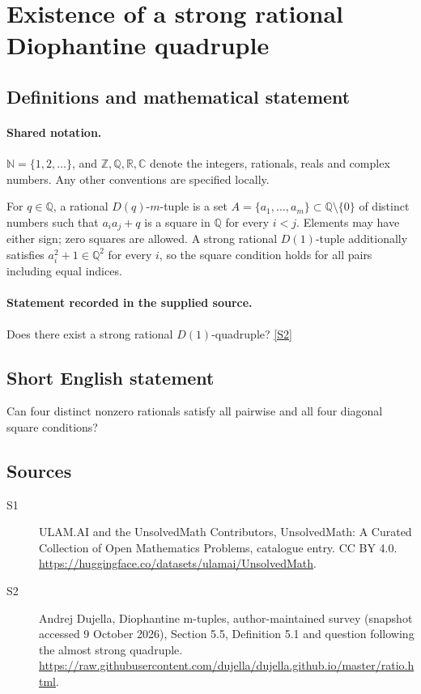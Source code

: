 \documentclass[11pt]{article}
\newcommand{\sref}[2]{\hyperlink{source:#1:#2}{[S#2]}}
\begin{document}
\section{Existence of a strong rational Diophantine quadruple}\label{statement}

\subsection{Definitions and mathematical statement}

\paragraph{Shared notation.}$\mathbb N=\{1,2,\ldots\}$, and $\mathbb Z,\mathbb Q,\mathbb R,\mathbb C$ denote the integers, rationals, reals and complex numbers. Any other conventions are specified locally.


For $q\in\mathbb Q$, a rational $D(q)$-$m$-tuple is a set $A=\{a_1,\ldots,a_m\}\subset\mathbb Q\setminus\{0\}$ of distinct numbers such that $a_i a_j+q$ is a square in $\mathbb Q$ for every $i<j$. Elements may have either sign; zero squares are allowed. A strong rational $D(1)$-tuple additionally satisfies $a_i^2+1\in\mathbb Q^2$ for every $i$, so the square condition holds for all pairs including equal indices.
\paragraph{Statement recorded in the supplied source.}
Does there exist a strong rational $D(1)$-quadruple? \sref{statement}{2}
\subsection{Short English statement}
Can four distinct nonzero rationals satisfy all pairwise and all four diagonal square conditions?
\subsection{Sources}
\begin{description}
\item[\hypertarget{source:statement:1}{S1}] ULAM.AI and the UnsolvedMath Contributors, UnsolvedMath: A Curated Collection of Open Mathematics Problems, catalogue entry. CC BY 4.0. \url{https://huggingface.co/datasets/ulamai/UnsolvedMath}.
\item[\hypertarget{source:statement:2}{S2}] Andrej Dujella, Diophantine m-tuples, author-maintained survey (snapshot accessed 9 October 2026), Section 5.5, Definition 5.1 and question following the almost strong quadruple. \url{https://raw.githubusercontent.com/dujella/dujella.github.io/master/ratio.html}.
\end{description}
\label{end:statement}
\end{document}
